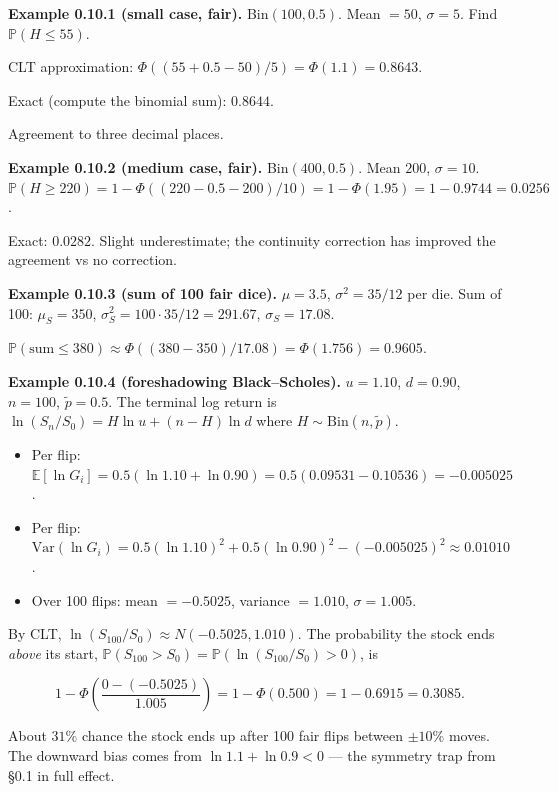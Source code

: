 \documentclass[
  10pt,
  twoside]{book}
\providecommand{\tightlist}{%
  \setlength{\itemsep}{0pt}\setlength{\parskip}{0pt}}
\begin{document}
\textbf{Example 0.10.1 (small case, fair).} Bin\((100, 0.5)\). Mean
\(= 50\), \(\sigma = 5\). Find \(\mathbb{P}(H \leq 55)\).

CLT approximation: \(\Phi((55 + 0.5 - 50)/5) = \Phi(1.1) = 0.8643\).

Exact (compute the binomial sum): \(0.8644\).

Agreement to three decimal places.

\textbf{Example 0.10.2 (medium case, fair).} Bin\((400, 0.5)\). Mean
\(200\), \(\sigma = 10\).
\(\mathbb{P}(H \geq 220) = 1 - \Phi((220 - 0.5 - 200)/10) = 1 - \Phi(1.95) = 1 - 0.9744 = 0.0256\).

Exact: \(0.0282\). Slight underestimate; the continuity correction has
improved the agreement vs no correction.

\textbf{Example 0.10.3 (sum of 100 fair dice).} \(\mu = 3.5\),
\(\sigma^2 = 35/12\) per die. Sum of 100: \(\mu_{S} = 350\),
\(\sigma_{S}^2 = 100 \cdot 35/12 = 291.67\), \(\sigma_S = 17.08\).

\(\mathbb{P}(\text{sum} \leq 380) \approx \Phi((380 - 350)/17.08) = \Phi(1.756) = 0.9605\).

\textbf{Example 0.10.4 (foreshadowing Black--Scholes).} \(u = 1.10\),
\(d = 0.90\), \(n = 100\), \(\tilde p = 0.5\). The terminal log return
is \(\ln(S_n / S_0) = H \ln u + (n - H) \ln d\) where
\(H \sim \mathrm{Bin}(n, \tilde p)\).

\begin{itemize}
\tightlist
\item
  Per flip:
  \(\mathbb{E}[\ln G_i] = 0.5 (\ln 1.10 + \ln 0.90) = 0.5(0.09531 - 0.10536) = -0.005025\).
\item
  Per flip:
  \(\mathrm{Var}(\ln G_i) = 0.5 (\ln 1.10)^2 + 0.5 (\ln 0.90)^2 - (-0.005025)^2 \approx 0.01010\).
\item
  Over 100 flips: mean \(= -0.5025\), variance \(= 1.010\),
  \(\sigma = 1.005\).
\end{itemize}

By CLT, \(\ln(S_{100}/S_0) \approx N(-0.5025, 1.010)\). The probability
the stock ends \emph{above} its start,
\(\mathbb{P}(S_{100} > S_0) = \mathbb{P}(\ln(S_{100}/S_0) > 0)\), is

\[1 - \Phi\!\left(\frac{0 - (-0.5025)}{1.005}\right) = 1 - \Phi(0.500) = 1 - 0.6915 = 0.3085.\]

About \(31\%\) chance the stock ends up after 100 fair flips between
\(\pm 10\%\) moves. The downward bias comes from
\(\ln 1.1 + \ln 0.9 < 0\) --- the symmetry trap from §0.1 in full
effect.
\end{document}
